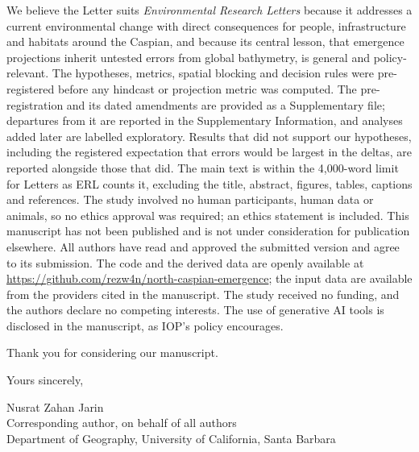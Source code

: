 \documentclass[11pt,a4paper]{article}
\begin{document}
We believe the Letter suits \emph{Environmental Research Letters} because it addresses a current environmental change with direct consequences for people, infrastructure and habitats around the Caspian, and because its central lesson, that emergence projections inherit untested errors from global bathymetry, is general and policy-relevant. The hypotheses, metrics, spatial blocking and decision rules were pre-registered before any hindcast or projection metric was computed. The pre-registration and its dated amendments are provided as a Supplementary file; departures from it are reported in the Supplementary Information, and analyses added later are labelled exploratory. Results that did not support our hypotheses, including the registered expectation that errors would be largest in the deltas, are reported alongside those that did.
The main text is within the 4,000-word limit for Letters as ERL counts it, excluding the title, abstract, figures, tables, captions and references. The study involved no human participants, human data or animals, so no ethics approval was required; an ethics statement is included. This manuscript has not been published and is not under consideration for publication elsewhere. All authors have read and approved the submitted version and agree to its submission. The code and the derived data are openly available at \url{https://github.com/rezw4n/north-caspian-emergence}; the input data are available from the providers cited in the manuscript. The study received no funding, and the authors declare no competing interests. The use of generative AI tools is disclosed in the manuscript, as IOP's policy encourages.

Thank you for considering our manuscript.

Yours sincerely,

Nusrat Zahan Jarin\\
Corresponding author, on behalf of all authors\\
Department of Geography, University of California, Santa Barbara
\end{document}

